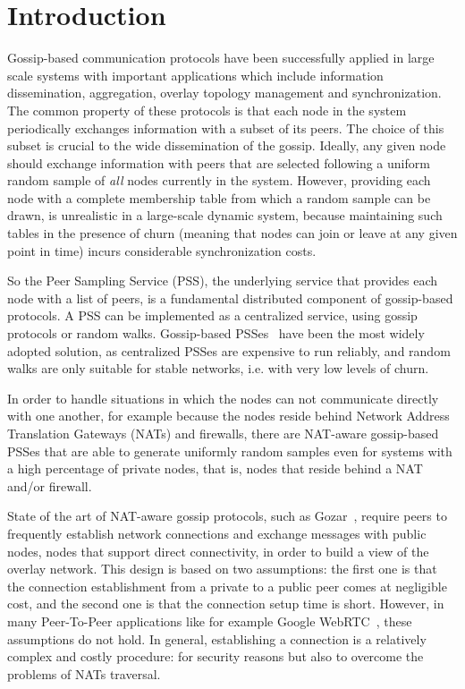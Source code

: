 
\chapter*{Introduction} %
\label{sommario}

Gossip-based communication protocols have been successfully applied in large scale systems with important applications which include information dissemination, aggregation, overlay topology management and synchronization. The common property of these protocols is that each node in the system periodically exchanges information with a subset of its peers. The choice of this subset is crucial to the wide dissemination of the gossip. Ideally, any given node should exchange information with peers that are selected following a uniform random sample of \textit{all} nodes currently in the system. However, providing each node with a complete membership table from which a random sample can be drawn, is unrealistic in a large-scale dynamic system, because maintaining such tables in the presence of churn (meaning that nodes can join or leave at any given point in time) incurs considerable synchronization costs. 

So the Peer Sampling Service (PSS), the underlying service that provides each node with a list of peers, is a fundamental distributed component of gossip-based protocols. A PSS can be implemented as a centralized service, using gossip protocols or random walks. Gossip-based PSSes~\cite{gossip_protocol} have been the most widely adopted solution, as centralized PSSes are expensive to run reliably, and random walks are only suitable for stable networks, i.e. with very low levels of churn. 

In order to handle situations in which the nodes can not communicate directly with one another, for example because the nodes reside behind Network Address Translation Gateways (NATs) and firewalls, there are NAT-aware gossip-based PSSes that are able to generate uniformly random samples even for systems with a high percentage of private nodes, that is, nodes that reside behind a NAT and/or firewall. 

State of the art of NAT-aware gossip protocols, such as Gozar~\cite{gozar}, require peers to frequently establish network connections and exchange messages with public nodes, nodes that support direct connectivity, in order to build a view of the overlay network. This design is based on two assumptions: the first one is that the connection establishment from a private to a public peer comes at negligible cost, and the second one is that the connection setup time is short. However, in many Peer-To-Peer applications like for example Google WebRTC~\cite{webrtc}, these assumptions do not hold. In general, establishing a connection is a relatively complex and costly procedure: for security reasons but also to overcome the problems of NATs traversal. 

